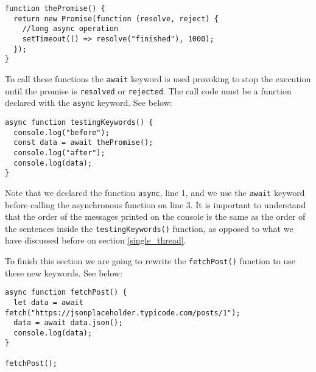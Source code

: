 \documentclass[a4paper, oneside, titlepage, 12pt]{book}
\begin{document}
\begin{verbatim}
function thePromise() {
  return new Promise(function (resolve, reject) {
    //long async operation
    setTimeout(() => resolve("finished"), 1000);
  });
}
\end{verbatim}

To call these functions the \texttt{await} keyword is used provoking to stop the execution until the promise is \texttt{resolved} or \texttt{rejected}. The call code must be a function declared with the \texttt{async} keyword. See below: 

\begin{verbatim}
async function testingKeywords() {
  console.log("before");
  const data = await thePromise();
  console.log("after");
  console.log(data);
}
\end{verbatim}

Note that we declared the function \texttt{async}, line 1, and we use the \texttt{await} keyword before calling the asynchronous function on line 3. It is important to understand that the order of the messages printed on the console is the same as the order of the sentences inside the \texttt{testingKeywords()} function, as opposed to what we have discussed before on section \ref{single_thread}.
\newline

To finish this section we are going to rewrite the \texttt{fetchPost()} function to use these new keywords. See below:

\begin{verbatim}
async function fetchPost() {
  let data = await fetch("https://jsonplaceholder.typicode.com/posts/1");
  data = await data.json();
  console.log(data);
}

fetchPost();
\end{verbatim}
\end{document}
